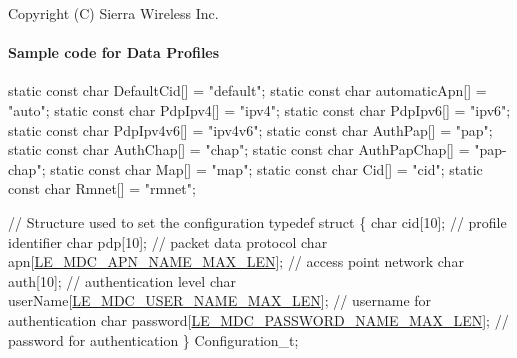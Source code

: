 Copyright (C) Sierra Wireless Inc. \hypertarget{c_mdcDataProfiles}{}\paragraph{Sample code for Data Profiles}\label{c_mdcDataProfiles}

\begin{DoxyCodeInclude}
\textcolor{keyword}{static} \textcolor{keyword}{const} \textcolor{keywordtype}{char} DefaultCid[] = \textcolor{stringliteral}{"default"};
\textcolor{keyword}{static} \textcolor{keyword}{const} \textcolor{keywordtype}{char} automaticApn[] = \textcolor{stringliteral}{"auto"};
\textcolor{keyword}{static} \textcolor{keyword}{const} \textcolor{keywordtype}{char} PdpIpv4[] = \textcolor{stringliteral}{"ipv4"};
\textcolor{keyword}{static} \textcolor{keyword}{const} \textcolor{keywordtype}{char} PdpIpv6[] = \textcolor{stringliteral}{"ipv6"};
\textcolor{keyword}{static} \textcolor{keyword}{const} \textcolor{keywordtype}{char} PdpIpv4v6[] = \textcolor{stringliteral}{"ipv4v6"};
\textcolor{keyword}{static} \textcolor{keyword}{const} \textcolor{keywordtype}{char} AuthPap[] = \textcolor{stringliteral}{"pap"};
\textcolor{keyword}{static} \textcolor{keyword}{const} \textcolor{keywordtype}{char} AuthChap[] = \textcolor{stringliteral}{"chap"};
\textcolor{keyword}{static} \textcolor{keyword}{const} \textcolor{keywordtype}{char} AuthPapChap[] = \textcolor{stringliteral}{"pap-chap"};
\textcolor{keyword}{static} \textcolor{keyword}{const} \textcolor{keywordtype}{char} Map[] = \textcolor{stringliteral}{"map"};
\textcolor{keyword}{static} \textcolor{keyword}{const} \textcolor{keywordtype}{char} Cid[] = \textcolor{stringliteral}{"cid"};
\textcolor{keyword}{static} \textcolor{keyword}{const} \textcolor{keywordtype}{char} Rmnet[] = \textcolor{stringliteral}{"rmnet"};

\textcolor{comment}{// Structure used to set the configuration}
\textcolor{keyword}{typedef} \textcolor{keyword}{struct}
\{
    \textcolor{keywordtype}{char}   cid[10];                                 \textcolor{comment}{// profile identifier}
    \textcolor{keywordtype}{char}   pdp[10];                                 \textcolor{comment}{// packet data protocol}
    \textcolor{keywordtype}{char}   apn[\hyperlink{le__mdc__interface_8h_a94003147532b5c18b83cac9a4e1eb054}{LE\_MDC\_APN\_NAME\_MAX\_LEN}];            \textcolor{comment}{// access point network}
    \textcolor{keywordtype}{char}   auth[10];                                \textcolor{comment}{// authentication level}
    \textcolor{keywordtype}{char}   userName[\hyperlink{le__mdc__interface_8h_ad246bc94c8c69c08d2765cc0570aa3cf}{LE\_MDC\_USER\_NAME\_MAX\_LEN}];      \textcolor{comment}{// username for authentication}
    \textcolor{keywordtype}{char}   password[\hyperlink{le__mdc__interface_8h_a37643c42ade5141861f6c19c17378c2f}{LE\_MDC\_PASSWORD\_NAME\_MAX\_LEN}];  \textcolor{comment}{// password for
       authentication}
\}
Configuration\_t;


\end{DoxyCodeInclude}
